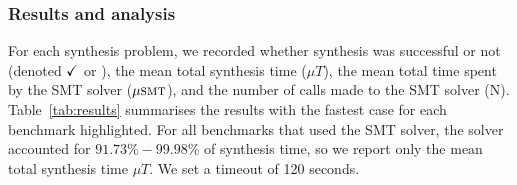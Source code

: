 \subsubsection{Results and analysis}
%
For each synthesis problem, we recorded whether synthesis
was successful or not (denoted $\checkmark$ or \fail), the mean
total synthesis time ($\mu{T}$), the mean total time spent by
the SMT solver ($\mu\textsc{smt}$), and the number of
calls made to the SMT solver (\textsc{N}).
Table~\ref{tab:results} summarises the results with the fastest case for each
benchmark highlighted.
For all benchmarks that used
the SMT solver, the solver accounted for $91.73\%-99.98\%$
of synthesis time, so we report only the mean
total synthesis time $\mu{T}$. %
We set a timeout of 120 seconds.

